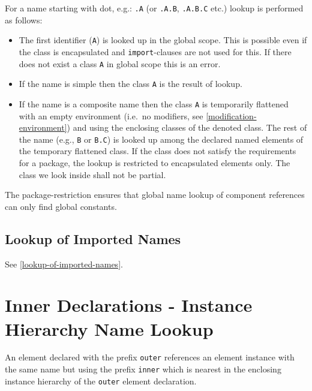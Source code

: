 For a name starting with dot, e.g.: \lstinline!.A! (or \lstinline!.A.B!, \lstinline!.A.B.C! etc.) lookup is performed as follows:
\begin{itemize}
\item
  The first identifier (\lstinline!A!) is looked up in the global scope.
  This is possible even if the class is encapsulated and \lstinline!import!-clauses are not used for this.
  If there does not exist a class \lstinline!A! in global scope this is an error.
\item
  If the name is simple then the class \lstinline!A! is the result of lookup.
\item
  If the name is a composite name then the class \lstinline!A! is temporarily flattened with an empty environment (i.e.\ no modifiers, see \cref{modification-environment}) and using the enclosing classes of the denoted class.
  The rest of the name (e.g., \lstinline!B! or \lstinline!B.C!) is looked up among the declared named elements of the temporary flattened class.
  If the class does not satisfy the requirements for a package, the lookup is restricted to encapsulated elements only.
  The class we look inside shall not be partial.
\end{itemize}

\begin{nonnormative}
The package-restriction ensures that global name lookup of component references can only find global constants.
\end{nonnormative}


\subsection{Lookup of Imported Names}\label{lookup-of-imported-names1}

See \cref{lookup-of-imported-names}.


\section{Inner Declarations - Instance Hierarchy Name Lookup}\label{instance-hierarchy-name-lookup-of-inner-declarations}\label{inner-declarations-instance-hierarchy-name-lookup}

An element declared with the prefix \lstinline!outer! references an element instance with the same name but using the prefix \lstinline!inner! which is nearest in the enclosing instance hierarchy of the \lstinline!outer! element declaration.

